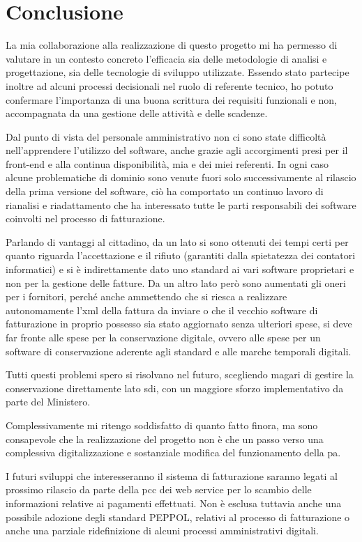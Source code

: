 \chapter*{Conclusione}

La mia collaborazione alla realizzazione di questo progetto mi ha permesso di valutare in un contesto concreto l'efficacia sia delle metodologie di analisi e progettazione, sia delle tecnologie di sviluppo utilizzate.
Essendo stato partecipe inoltre ad alcuni processi decisionali nel ruolo di referente tecnico, ho potuto confermare l'importanza di una buona scrittura dei requisiti funzionali e non, accompagnata da una gestione delle attività e delle scadenze.

Dal punto di vista del personale amministrativo non ci sono state difficoltà nell'apprendere l'utilizzo del software, anche grazie agli accorgimenti presi per il front-end e alla continua disponibilità, mia e dei miei referenti.
In ogni caso alcune problematiche di dominio sono venute fuori solo successivamente al rilascio della prima versione del software, ciò ha comportato un continuo lavoro di rianalisi e riadattamento che ha interessato tutte le parti responsabili dei software coinvolti nel processo di fatturazione.

Parlando di vantaggi al cittadino, da un lato si sono ottenuti dei tempi certi per quanto riguarda l'accettazione e il rifiuto (garantiti dalla spietatezza dei contatori informatici) e si è indirettamente dato uno standard ai vari software proprietari e non per la gestione delle fatture.
Da un altro lato però sono aumentati gli oneri per i fornitori, perché anche ammettendo che si riesca a realizzare autonomamente l'xml della fattura da inviare o che il vecchio software di fatturazione in proprio possesso sia stato aggiornato senza ulteriori spese, si deve far fronte alle spese per la conservazione digitale, ovvero alle spese per un software di conservazione aderente agli standard e alle marche temporali digitali.

Tutti questi problemi spero si risolvano nel futuro, scegliendo magari di gestire la conservazione direttamente lato \Gls{sdi}, con un maggiore sforzo implementativo da parte del Ministero.

Complessivamente mi ritengo soddisfatto di quanto fatto finora, ma sono consapevole che la realizzazione del progetto non è che un passo verso una complessiva digitalizzazione e sostanziale modifica del funzionamento della \Gls{pa}.

I futuri sviluppi che interesseranno il sistema di fatturazione saranno legati al prossimo rilascio da parte della \Gls{pcc} dei web service per lo scambio delle informazioni relative ai pagamenti effettuati.
Non è esclusa tuttavia anche una possibile adozione degli standard PEPPOL, relativi al processo di fatturazione o anche una parziale ridefinizione di alcuni processi amministrativi digitali.